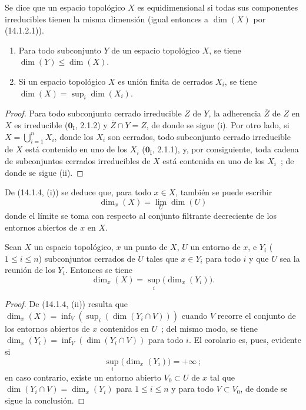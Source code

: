 \begin{definition}[14.1.3]
\label{0.14.1.3-es}
Se dice que un espacio topológico $X$ es equidimensional si todas sus
componentes irreducibles tienen la misma dimensión \textup{(igual entonces a $\dim(X)$
por (14.1.2.1))}.
\end{definition}

\begin{proposition}[14.1.4]
\label{0.14.1.4-es}
\begin{enumerate}
  \item[\rm(i)] Para todo subconjunto $Y$ de un espacio topológico $X$, se tiene
  $\dim(Y)\leq\dim(X)$.
  \item[\rm(ii)] Si un espacio topológico $X$ es unión finita de cerrados
  $X_i$, se tiene $\dim(X)=\sup_i\dim(X_i)$.
\end{enumerate}
\end{proposition}

\begin{proof}
Para todo subconjunto cerrado irreducible $Z$ de $Y$, la adherencia $\overline Z$
de $Z$ en $X$ es irreducible ($\mathbf{0}_{\mathrm I}$, 2.1.2) y
$\overline Z\cap Y=Z$, de donde se sigue (i). Por otro lado, si
$X=\bigcup_{i=1}^n X_i$, donde los $X_i$ son cerrados, todo subconjunto cerrado
irreducible de $X$ está contenido en uno de los $X_i$ ($\mathbf{0}_{\mathrm I}$, 2.1.1),
y, por consiguiente, toda cadena de subconjuntos cerrados irreducibles de $X$
está contenida en uno de los $X_i$~; de donde se sigue (ii).
\end{proof}

De (14.1.4, (i)) se deduce que, para todo $x\in X$, también se puede escribir
\[
  \dim_x(X)=\lim_U\dim(U)
  \tag{14.1.4.1}\label{0.14.1.4.1-es}
\]
donde el límite se toma con respecto al conjunto filtrante decreciente de los
entornos abiertos de $x$ en $X$.

\begin{corollary}[14.1.5]
\label{0.14.1.5-es}
Sean $X$ un espacio topológico, $x$ un punto de $X$, $U$ un entorno de
$x$, e $Y_i$ \textup{($1\leq i\leq n$)} subconjuntos cerrados de $U$ tales que
$x\in Y_i$ para todo $i$ y que $U$ sea la reunión de los $Y_i$. Entonces se tiene
\[
  \dim_x(X)=\sup_i\bigl(\dim_x(Y_i)\bigr).
  \tag{14.1.5.1}\label{0.14.1.5.1-es}
\]
\end{corollary}

\begin{proof}
De (14.1.4, (ii)) resulta que
$\dim_x(X)=\inf_V(\sup_i(\dim(Y_i\cap V)))$ cuando $V$ recorre el conjunto
de los entornos abiertos de $x$ contenidos en $U$~; del mismo modo, se tiene
$\dim_x(Y_i)=\inf_V(\dim(Y_i\cap V))$ para todo $i$. El corolario es, pues,
evidente si
\[
  \sup_i\bigl(\dim_x(Y_i)\bigr)=+\infty~;
\]
en caso contrario, existe un entorno abierto $V_0\subset U$ de $x$ tal
que $\dim(Y_i\cap V)=\dim_x(Y_i)$ para $1\leq i\leq n$ y para todo
$V\subset V_0$, de donde se sigue la conclusión.
\end{proof}


